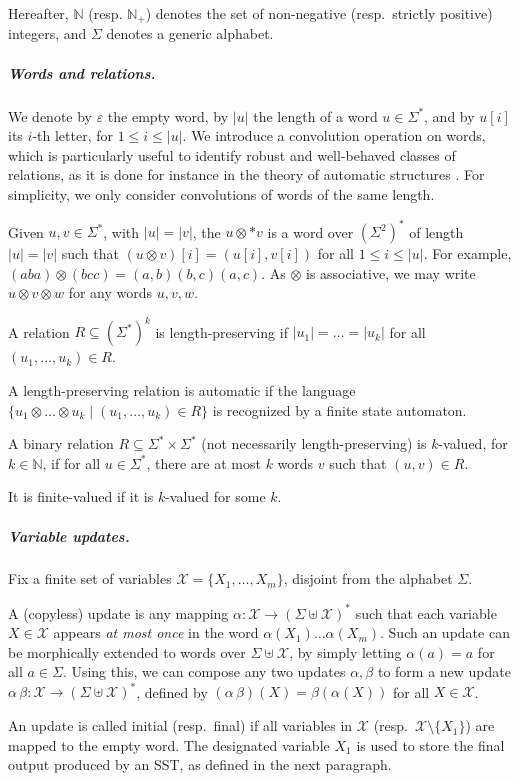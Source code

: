 \documentclass{article}
\providecommand{\AP}{}\NewDocumentCommand{\reintro}{o m}{#2}
\newcommand{\var}{\mathcal{X}}
\newcommand{\alp}{\Sigma}
\begin{document}
Hereafter, $\mathbb{N}$ (resp. $\mathbb{N}_+$) 
denotes the set of non-negative (resp.~strictly positive) integers,
and $\alp$ denotes a generic alphabet.


\medskip
\subparagraph*{\bf Words and relations.}
We denote by $\varepsilon$ the empty word, 
by $|u|$ the length of a word $u\in\alp^*$, and by
$u[i]$ its $i$-th letter, for $1\leq i\leq |u|$. 
We introduce a convolution operation on words,
which is particularly useful to identify robust and
well-behaved classes of relations, 
as it is done for instance in the theory of automatic structures \cite{BlumensathG00}.
For simplicity, we only consider convolutions of 
words of the same length. 
\AP
Given $u,v\in\alp^*$, with $|u|=|v|$,
the  $u \otimes* v$ 
is a word over $(\alp^2)^*$ of length $|u|=|v|$ such that 
$(u\otimes v)[i] = (u[i],v[i])$ for all $1\leq i\leq |u|$. 
For example, $(aba)\otimes (bcc) = (a,b)(b,c)(a,c)$. 
As $\otimes$ is associative, we may write 
$u\otimes v\otimes w$ for any words $u,v,w$. 

\AP
A relation $R\subseteq (\alp^*)^k$ is length-preserving
if $|u_1|=\dots=|u_k|$ for all $(u_1,\dots,u_k)\in R$. 
\AP
A length-preserving relation is automatic
if the language 
$\{ u_1\otimes \dots \otimes u_k \mid (u_1,\dots,u_k)\in R\}$ 
is recognized by a finite state automaton.
\AP
A binary relation $R\subseteq \alp^*\times \alp^*$ (not
necessarily length-preserving)
is $k$-valued, for $k\in\mathbb{N}$, if for all $u\in\alp^*$, 
there are at most $k$ words $v$ such that $(u,v)\in R$. 
\AP
It is finite-valued if it is $k$-valued for some $k$.



\medskip
\subparagraph*{\bf Variable updates.} 
Fix a finite set of variables $\var = \{X_1, \dots, X_m\}$,
disjoint from the alphabet $\alp$.
\AP
A (copyless) update is any mapping 
$\alpha: \var\rightarrow (\alp \uplus \var)^*$
such that each variable $X\in\var$ appears \emph{at most once}
in the word $\alpha(X_1)\dots\alpha(X_m)$.
Such an update can be morphically extended to words over $\alp\uplus\var$,
by simply letting $\alpha(a) = a$ for all $a\in\alp$.
Using this, we can compose any two updates $\alpha,\beta$ to form 
a new update $\alpha \, \beta : \var \rightarrow (\alp \uplus \var)^*$, 
defined by $(\alpha \, \beta)(X) = \beta(\alpha(X))$ for all $X\in\var$.
\AP
An update is called initial (resp.~final)
if all variables in $\var$ (resp.~$\var\setminus\{X_1\}$) are mapped
to the empty word. The designated variable $X_1$ is used to store
the final output produced by an SST, as defined in the next
paragraph.
\end{document}

